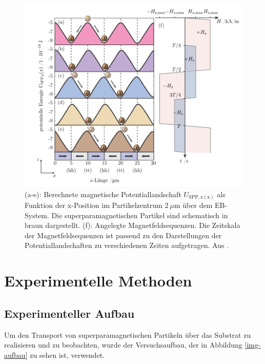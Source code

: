 \documentclass[page,pdftex,12pt,a4paper,twoside,openright]{scrbook}
\begin{document}
\begin{figure}[h]
\centering
\includegraphics[width=\textwidth]{img/trapez.png}
\caption{\label{fig-transport}
(a-e): Berechnete magnetische Potentiallandschaft \(U_\mathrm{SPP,z(x)}\) als Funktion der x-Position im Partikelzentrum \(\SI{2}{\mu\meter}\) über dem EB-System. Die superparamagnetischen Partikel sind schematisch in braun dargestellt. (f): Angelegte Magnetfeldsequenzen. Die Zeitskala der Magnetfeldsequenzen ist passend zu den Darstellungen der Potentiallandschaften zu verschiedenen Zeiten aufgetragen. Aus \cite{holzinger_transport_2015}.}
\end{figure}
\chapter{Experimentelle Methoden \label{sec-methoden}}
\label{sec:orgc672d1c}
\section{Experimenteller Aufbau \label{sec-aufbau}}
\label{sec:orgd73d267}

Um den Transport von superparamagnetischen Partikeln über das Substrat zu realisieren und zu beobachten, wurde der Versuchsaufbau, der in Abbildung \ref{img-aufbau} zu sehen ist, verwendet.\\
\end{document}
